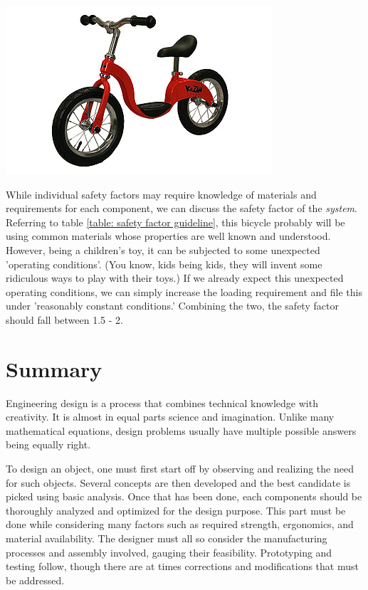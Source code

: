 \documentclass[a4paper,openany,12pt]{book}
\begin{document}
\begin{center}
\includegraphics[width=.9\linewidth]{pictures/intro-eng-design/balance-bike.jpg}
\end{center}

While individual safety factors may require knowledge of materials and
requirements for each component, we can discuss the safety factor of the
\emph{system}. Referring to table \ref{table: safety factor guideline},
this bicycle probably will be using common materials whose properties
are well known and understood. However, being a children's toy, it can
be subjected to some unexpected 'operating conditions'. (You know, kids
being kids, they will invent some ridiculous ways to play with their
toys.) If we already expect this unexpected operating conditions, we can
simply increase the loading requirement and file this under 'reasonably
constant conditions.' Combining the two, the safety factor should fall
between 1.5 - 2.

\section{Summary}
\label{summary}
Engineering design is a process that combines technical knowledge with
creativity. It is almost in equal parts science and imagination. Unlike
many mathematical equations, design problems usually have multiple
possible answers being equally right.

To design an object, one must first start off by observing and realizing
the need for such objects. Several concepts are then developed and the
best candidate is picked using basic analysis. Once that has been done,
each components should be thoroughly analyzed and optimized for the
design purpose. This part must be done while considering many factors
such as required strength, ergonomics, and material availability. The
designer must all so consider the manufacturing processes and assembly
involved, gauging their feasibility. Prototyping and testing follow,
though there are at times corrections and modifications that must be
addressed.
\end{document}
